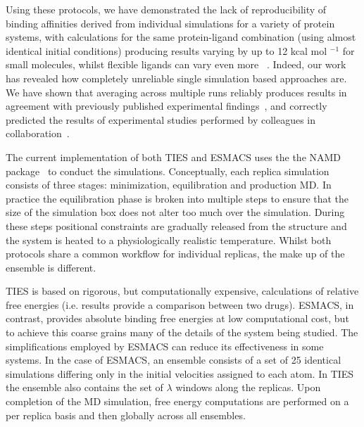 
Using these protocols, we have demonstrated the lack of reproducibility of
binding affinities derived from individual simulations for a variety of protein 
systems, with calculations for the same protein-ligand combination (using almost 
identical initial conditions) producing results varying by up to 12 kcal
mol $^{-1}$ for small molecules, whilst flexible ligands can vary even
more ~\cite{Sadiq2010, Wright2014}. 
Indeed, our work has revealed how completely unreliable single simulation based 
approaches are. 
We have shown that averaging across multiple runs reliably produces results in
agreement with previously published experimental findings~\cite{Sadiq2010,
Wan2011, Wright2014, Bhati2017, Wan2017brd4, Wan2017trk}, and correctly
predicted the results of experimental studies performed by colleagues in
collaboration~\cite{Bunney2015}. 


The current implementation of both TIES and ESMACS uses the the NAMD 
package~\cite{Phillips2005} to conduct the simulations. Conceptually, each 
replica simulation consists of three stages: minimization, equilibration and 
production MD. In practice the equilibration phase is broken into multiple 
steps to ensure that the size of the simulation box does not alter too much 
over the simulation. During these steps positional constraints are gradually 
released from the structure and the system is heated to a physiologically 
realistic temperature. Whilst both protocols share a common workflow for 
individual replicas, the make up of the ensemble is different.


TIES is based on rigorous, but computationally expensive, calculations of 
relative free energies (i.e. results provide a comparison between two drugs). 
ESMACS, in contrast, provides absolute binding free energies at low 
computational cost, but to achieve this coarse grains many of the details of 
the system being studied. The simplifications employed by ESMACS can reduce its 
effectiveness in some systems. In the case of ESMACS, an ensemble consists of a 
set of 25 identical simulations differing only in the initial velocities 
assigned to each atom. In TIES the ensemble also contains the set of $\lambda$ 
windows along the replicas. Upon completion of the MD simulation, free energy 
computations are performed on a per replica basis and then globally across all 
ensembles. 

